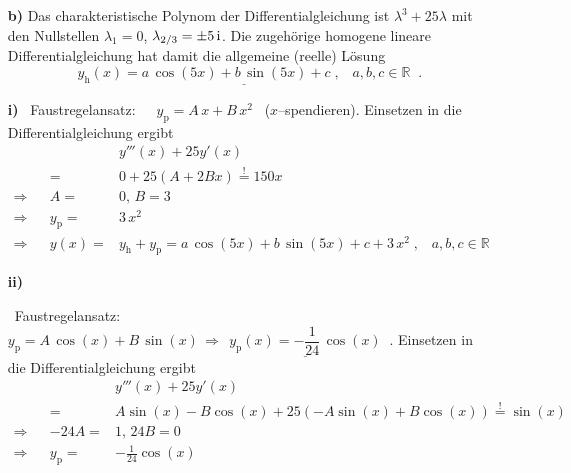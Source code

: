 {\begin{enumerate}
F\"ur\ \ $r=14\,\EH{3x}$\ \ ergibt sich nach ii) : \ \ \ $\underline{\;y_{\text{p}_{2}}(x)=14x\,\EH{3x}\;}\;.$

Allgemeine L\"osung: \ \ \ $\underline{\underline{\;y(x)=y_{\text{h}}+y_{\text{p}_{1}}+y_{\text{p}_{2}} = a\,\EH{2x}+b\,\EH{3x}+3+14x\,\EH{3x}\;,\;\;a,b\in \mathbb{R}\;}}\;.$


\item[\textbf{b)}]  Das charakteristische Polynom der Differentialgleichung ist $\lambda^3+25\lambda$ mit den Nullstellen $\lambda_1=0$, $\lambda_{2/3}=\pm 5\,\mathrm{i}$. Die zugeh\"orige homogene lineare Differentialgleichung hat damit die allgemeine (reelle) L\"osung 
\[
\underline{\;y_{\text{h}}(x)=a\,\cos (5x)+b\,\sin (5x)+c\;,\;\;\;a,b,c\in \mathbb{R}\;}\;. 
\]

\textbf{i)} \ Faustregelansatz:\ \ \ $y_{\text{p}}=A\,x+B\,x^{2}$ \ (\glqq$x$--spendieren\grqq). Einsetzen in die Differentialgleichung ergibt
\begin{align*}
&&&y'''(x)+25y'(x)\\
&&=& 0 + 25(A+2Bx) \overset!= 150 x\\
\Rightarrow && A=&0,\, B=3\\
\Rightarrow&& y_{\text{p}}=&3\,x^{2}\\
\Rightarrow&& y(x)=& y_{\text{h}}+y_{\text{p}} = 
a\,\cos(5x)+b\,\sin(5x)+c+3\,x^{2}\;,\;\;\;a,b,c\in \mathbb{R}
\end{align*}

\textbf{ii)} 
% 
% 
% 
% 
% 

\ Faustregelansatz:\ \ \ $y_{\text{p}}=A\,\cos(x)+B\,\sin(x) \,\Rightarrow\,  \underline{\;y_{\text{p}}(x)=-\dfrac{1}{24}\,\cos (x)\;}\;.$
Einsetzen in die Differentialgleichung ergibt
\begin{align*}
&&&y'''(x)+25y'(x)\\
&&=& A\sin(x) -B\cos(x) + 25(-A\sin(x)+B\cos(x)) \overset!= \sin(x)\\
\Rightarrow && -24A=&1,\, 24B=0\\
\Rightarrow&& y_{\text{p}}=&-\frac 1{24}\cos(x)
\end{align*}


\end{enumerate}}
